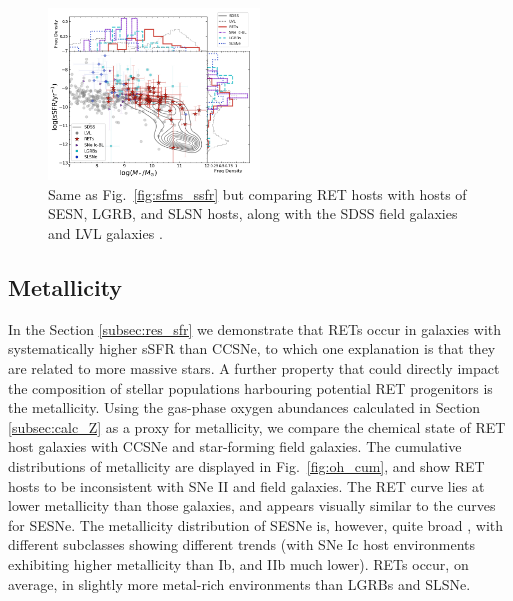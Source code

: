 \documentclass[fleqn,usenatbib,]{mnras}
\newcommand{\replyref}[1]{\color{magenta}#1 \color{black}}
\begin{document}
\begin{figure}
\includegraphics[width=0.5\textwidth]{figs/sSFR_Mike_other.png}
\caption{Same as Fig.~\ref{fig:sfms_ssfr} but comparing RET hosts with hosts of SESN, LGRB, and SLSN hosts, along with the SDSS field galaxies \replyref{and LVL galaxies}.
\label{fig:sfms_ssfr_other}}
\end{figure}

\subsection{Metallicity \label{subsec:res_metallicity}}

In the Section \ref{subsec:res_sfr} we demonstrate that RETs occur in galaxies with systematically higher sSFR than CCSNe, to which one explanation is that they are related to more massive stars. A further property that could directly impact the composition of stellar populations harbouring potential RET progenitors is the metallicity. Using the gas-phase oxygen abundances calculated in Section \ref{subsec:calc_Z} as a proxy for metallicity, we compare the chemical state of RET host galaxies with CCSNe and star-forming field galaxies. The cumulative distributions of metallicity are displayed in Fig.~\ref{fig:oh_cum}, and show RET hosts to be inconsistent with SNe II and field galaxies. The RET curve lies at lower metallicity than those galaxies, and appears visually similar to the curves for SESNe. The metallicity distribution of SESNe is, however, quite broad \citep[e.g.][]{Anderson2010}, with different subclasses showing different trends (with SNe Ic host environments exhibiting higher metallicity than Ib, and IIb much lower). RETs occur, on average, in slightly more metal-rich environments than LGRBs and SLSNe.
\end{document}
